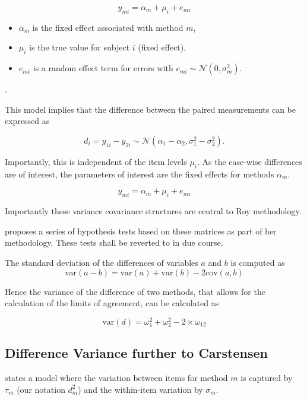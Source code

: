 \documentclass[12pt, a4paper]{report}
\theoremstyle{plain}
\theoremstyle{definition}
\theoremstyle{remark}
\begin{document}
\[ y_{mi} = \alpha_{m} + \mu_{i} + e_{mi}  \]

\begin{itemize}
	\item $\alpha_m$ is the fixed effect associated with method $m$,
	\item $\mu_i$ is the true value for subject $i$ (fixed effect),
	\item $e_{mi}$ is a
	random effect term for errors with $e_{mi}  \sim \mathcal{N}(0,\sigma^2_m)$. \end{itemize}.

This model implies that the difference between the paired measurements can be expressed as

\[ d_{i} = y_{1i} - y_{2i} \sim \mathcal{N} (\alpha_{1} - \alpha_{2}, \sigma^2_{1} - \sigma^2_{2}). \]

Importantly, this is independent of the item levels $\mu_i$. As the case-wise differences are of interest, the parameters of interest are the fixed effects for methods $\alpha_{m}$.

\[ y_{mi} =  \alpha_{m}  + \mu_{i} + e_{mi}  \]

\newpage



Importantly these variance covariance structures are central to Roy methodology.


\citet{Roy} proposes a series of hypothesis tests based on these matrices as part of her methodology. These tests shall be reverted to in due course.

The standard deviation of the differences of variables $a$ and $b$ is computed as
\[
\mbox{var}(a - b) = \mbox{var} ( a )  + \mbox{var} ( b ) - 2\mbox{cov} ( a ,b )
\]

Hence the variance of the difference of two methods, that allows for the calculation of the limits of agreement, can be calculated as

\[
\mbox{var}(d) = \omega^2_1  + \omega^2_2 - 2 \times \omega_12
\]







\newpage
\subsection{Difference Variance further to Carstensen}

\citet{bxc2008} states a model where the variation between items
for method $m$ is captured by $\tau_m$ (our notation $d^2_m$) and the within-item
variation by $\sigma_m$.
\end{document}
